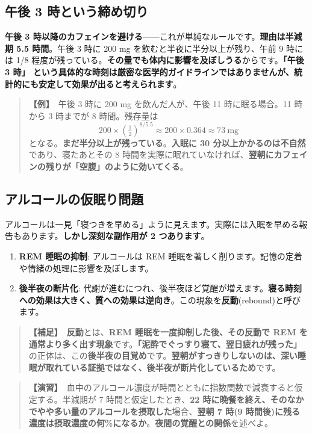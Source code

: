 \documentclass{article}
\begin{document}
\subsection{午後 3 時という締め切り}

\textbf{午後 3 時以降のカフェインを避ける}——これが単純なルールです。\textbf{理由は半減期 5.5 時間}。午後 3 時に 200 mg を飲むと半夜に半分以上が残り、午前 9 時には 1/8 程度が残っている。\textbf{その量でも体内に影響を及ぼしうる}からです。\textbf{「午後 3 時」 という具体的な時刻は厳密な医学的ガイドラインではありませんが、統計的にも安定して効果が出ると考えられます}。

\begin{quote}
\textbf{【例】}\ 午後 3 時に 200 mg を飲んだ人が、午後 11 時に眠る場合。11 時から 3 時までが 8 時間。残存量は
\[ 200 \times \left(\tfrac{1}{2}\right)^{8/5.5} \approx 200 \times 0.364 \approx 73\ \text{mg} \]
となる。\textbf{まだ半分以上が残っている}。\textbf{入眠に 30 分以上かかるのは不自然}であり、寝たあとその 8 時間を実際に眠れていなければ、\textbf{翌朝にカフェインの残りが「空腹」のように効いてくる}。
\end{quote}

\subsection{アルコールの仮眠り問題}

アルコールは一見「寝つきを早める」ように見えます。実際には入眠を早める報告もあります。\textbf{しかし深刻な副作用が 2 つあります}。

\begin{enumerate}
\item \textbf{REM 睡眠の抑制}: アルコールは REM 睡眠を著しく削ります。記憶の定着や情緒の処理に影響を及ぼします。
\item \textbf{後半夜の断片化}: 代謝が進むにつれ、後半夜ほど覚醒が増えます。\textbf{寝る時刻への効果は大きく、質への効果は逆向き}。この現象を\textbf{反動}(rebound)と呼びます。
\end{enumerate}

\begin{quote}
\textbf{【補足】}\ \textbf{反動}とは、\textbf{REM 睡眠を一度抑制した後、その反動で REM を通常より多く出す現象}です。\textbf{「泥酔でぐっすり寝て、翌日疲れが残った」}の正体は、この\textbf{後半夜の目覚め}です。\textbf{翌朝がすっきりしないのは、深い睡眠が取れている証拠ではなく、後半夜が断片化しているため}です。
\end{quote}

\begin{quote}
\textbf{【演習】}\ 血中のアルコール濃度が時間とともに指数関数で減衰すると仮定する。半減期が 7 時間と仮定したとき、\textbf{22 時に晩餐を終え、そのなかでやや多い量のアルコールを摂取した}場合、\textbf{翌朝 7 時(9 時間後)に残る濃度は摂取濃度の何\%になるか}。\textbf{夜間の覚醒との関係}を述べよ。
\end{quote}
\end{document}

